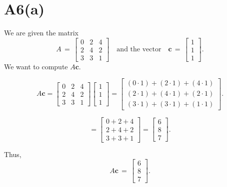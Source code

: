 \documentclass{article}
\begin{document}
\section*{A6(a)}

We are given the matrix 
\[
A 
\,=\, 
\begin{bmatrix}
0 & 2 & 4\\
2 & 4 & 2\\
3 & 3 & 1
\end{bmatrix}
\quad\text{and the vector}\quad
\mathbf{c}
\,=\,
\begin{bmatrix}
1\\
1\\
1
\end{bmatrix}.
\]
We want to compute \(A \mathbf{c}\).

\[
A \mathbf{c}
=
\begin{bmatrix}
0 & 2 & 4\\
2 & 4 & 2\\
3 & 3 & 1
\end{bmatrix}
\begin{bmatrix}
1\\
1\\
1
\end{bmatrix}
=
\begin{bmatrix}
(0 \cdot 1) + (2 \cdot 1) + (4 \cdot 1)\\[6pt]
(2 \cdot 1) + (4 \cdot 1) + (2 \cdot 1)\\[6pt]
(3 \cdot 1) + (3 \cdot 1) + (1 \cdot 1)
\end{bmatrix}.
\]

\[
= 
\begin{bmatrix}
0 + 2 + 4\\
2 + 4 + 2\\
3 + 3 + 1
\end{bmatrix}
=
\begin{bmatrix}
6\\
8\\
7
\end{bmatrix}.
\]

Thus, 
\[
A\mathbf{c}
\,=\,
\begin{bmatrix}
6\\
8\\
7
\end{bmatrix}.
\]
\end{document}
